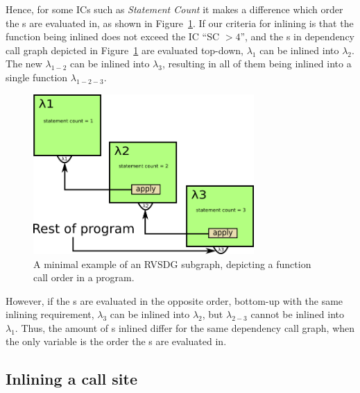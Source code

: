 
Hence, for some ICs such as \textit{Statement Count} it makes a difference which
order the \applyNode s are evaluated in, as shown in
Figure~\ref{fig:inline_ordering_ex}. If our criteria for inlining is that the
function being inlined does not exceed the IC ``SC $> 4$'', and the \applyNode s
in dependency call graph depicted in Figure~\ref{fig:inline_ordering_ex} are
evaluated top-down, $\lambda_1$ can be inlined into $\lambda_2$. The new
$\lambda_{1-2}$ can be inlined into $\lambda_3$, resulting in all of them being
inlined into a single function $\lambda_{1-2-3}$.

\begin{figure}[H]
	\centering
	\includegraphics[width=0.75\textwidth]{figures/inline_ordering_ex}
	\caption{A minimal example of an RVSDG subgraph, depicting a function call
order in a program.}
	\label{fig:inline_ordering_ex}
\end{figure}

However, if the \applyNode s are evaluated in the opposite order, bottom-up with
the same inlining requirement, $\lambda_3$ can be inlined into $\lambda_2$, but
$\lambda_{2-3}$ cannot be inlined into $\lambda_1$. Thus, the amount of
\applyNode s inlined differ for the same dependency call graph, when the only
variable is the order the \applyNode s are evaluated in.

\subsection{Inlining a call site}
\label{sub:scheme:inlining_apply_nodes}

